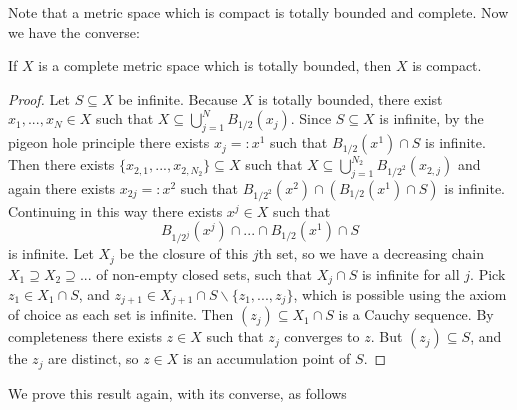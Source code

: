 Note that a metric space which is compact is totally bounded and complete. Now we have the converse:

\begin{prop}\label{prop:2.3.7}
    If $X$ is a complete metric space which is totally bounded, then $X$ is compact.
\end{prop}
\begin{proof}
    Let $S \subseteq X$ be infinite. Because $X$ is totally bounded, there exist $x_1,...,x_N \in X$ such that $X \subseteq \bigcup_{j=1}^NB_{1/2}(x_j)$. Since $S \subseteq X$ is infinite, by the pigeon hole principle there exists $x_j =: x^1$ such that $B_{1/2}(x^1)\cap S$ is infinite. Then there exists $\{x_{2,1},...,x_{2,N_2}\} \subseteq X$ such that $X \subseteq \bigcup_{j=1}^{N_2}B_{1/2^2}(x_{2,j})$ and again there exists $x_{2j} =: x^2$ such that $B_{1/2^2}(x^2) \cap (B_{1/2}(x^1)\cap S)$ is infinite. Continuing in this way there exists $x^j \in X$ such that \begin{equation*}
        B_{1/2^j}(x^j)\cap ... \cap B_{1/2}(x^1)\cap S
    \end{equation*}
    is infinite. Let $X_j$ be the closure of this $j$th set, so we have a decreasing chain $X_1 \supseteq X_2 \supseteq ...$ of non-empty closed sets, such that $X_j \cap S$ is infinite for all $j$. Pick $z_1\in X_1\cap S$, and $z_{j+1} \in X_{j+1}\cap S\backslash \{z_1,...,z_j\}$, which is possible using the axiom of choice as each set is infinite. Then $(z_j) \subseteq X_1 \cap S$ is a Cauchy sequence. By completeness there exists $z \in X$ such that $z_j$ converges to $z$. But $(z_j) \subseteq S$, and the $z_j$ are distinct, so $z \in X$ is an accumulation point of $S$.
\end{proof}

We prove this result again, with its converse, as follows

